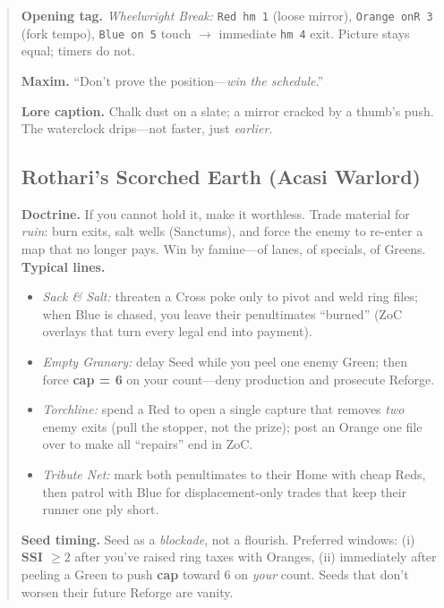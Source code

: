 \documentclass[11pt]{article}
\begin{document}
\begin{quote}
\medskip
\noindent\textbf{Opening tag.} \emph{Wheelwright Break:} \texttt{Red hm 1} (loose mirror), \texttt{Orange onR 3} (fork tempo), \texttt{Blue on 5} touch $\rightarrow$ immediate \texttt{hm 4} exit. Picture stays equal; timers do not.

\medskip
\noindent\textbf{Maxim.} ``Don’t prove the position---\emph{win the schedule}.''

\medskip
\noindent\textbf{Lore caption.} Chalk dust on a slate; a mirror cracked by a thumb’s push. The waterclock drips---not faster, just \emph{earlier}.
\clearpage
\subsection{Rothari’s Scorched Earth (Acasi Warlord)}
\noindent\textbf{Doctrine.} If you cannot hold it, make it worthless. Trade material for \emph{ruin}: burn exits, salt wells (Sanctums), and force the enemy to re-enter a map that no longer pays. Win by famine—of lanes, of specials, of Greens.\\

\noindent\textbf{Typical lines.}
\begin{itemize}\itemsep0.2em
  \item \emph{Sack \& Salt:} threaten a Cross poke only to pivot and weld ring files; when Blue is chased, you leave their penultimates “burned” (ZoC overlays that turn every legal end into payment).
  \item \emph{Empty Granary:} delay Seed while you peel one enemy Green; then force \textbf{cap = 6} on your count—deny production and prosecute Reforge.
  \item \emph{Torchline:} spend a Red to open a single capture that removes \emph{two} enemy exits (pull the stopper, not the prize); post an Orange one file over to make all “repairs” end in ZoC.
  \item \emph{Tribute Net:} mark both penultimates to their Home with cheap Reds, then patrol with Blue for displacement-only trades that keep their runner one ply short.
\end{itemize}

\noindent\textbf{Seed timing.} Seed as a \emph{blockade}, not a flourish. Preferred windows: (i) \textbf{SSI $\ge 2$} after you’ve raised ring taxes with Oranges, (ii) immediately after peeling a Green to push \textbf{cap} toward $6$ on \emph{your} count. Seeds that don’t worsen their future Reforge are vanity.\\


\end{quote}
\end{document}
